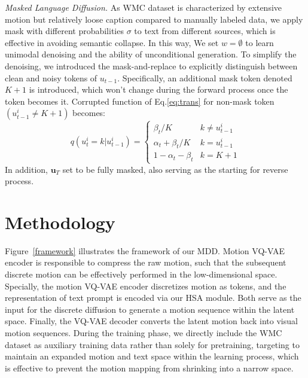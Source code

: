 \documentclass[letterpaper]{article} \usepackage{aaai24}
\begin{document}
\textit{Masked Language Diffusion.} As WMC dataset is characterized by extensive motion but relatively loose caption compared to manually labeled data, we apply mask with different probabilities $\sigma$ to text from different sources, which is effective in avoiding semantic collapse. In this way, We set $w=\emptyset$ to learn unimodal denoising and the ability of unconditional generation. To simplify the denoising, we introduced the mask-and-replace \cite{gu2022vector} to explicitly distinguish between clean and noisy tokens of $u_{t-1}$. Specifically, an additional mask token denoted $K+1$ is introduced, which won't change during the forward process once the token becomes it. Corrupted function of Eq.\ref{eq:trans} for non-mask token $(u^i_{t-1} \neq K+1)$ becomes:
\begin{equation}
    q(u_t^i = k|u_{t-1}^i) =
    \begin{cases}
        \beta_t / K & k \neq u^i_{t-1} \\
        \alpha_t + \beta_t / K & k = u^i_{t-1} \\
        1-\alpha_t-\beta_t & k=K+1
    \end{cases}
\end{equation}
In addition, $\bm{u}_T$ set to be fully masked, also serving as the starting for reverse process.



\section{Methodology}




Figure~\ref{framework} illustrates the framework of our MDD. Motion VQ-VAE encoder
is responsible to compress the raw motion, such that the subsequent discrete motion can be effectively performed in the low-dimensional space.  Specially, 
the motion VQ-VAE encoder discretizes motion as tokens, and the representation of text prompt is encoded via our HSA module. Both serve as the input for the discrete diffusion  to generate a motion sequence within the latent space. Finally, the VQ-VAE decoder converts the latent motion back into visual motion sequences.
During the training phase,  we directly include the WMC dataset as auxiliary training data rather than solely for pretraining, targeting to maintain an expanded motion and text space within the learning process, which is effective to  prevent the motion mapping from shrinking into a narrow space. 
\end{document}
